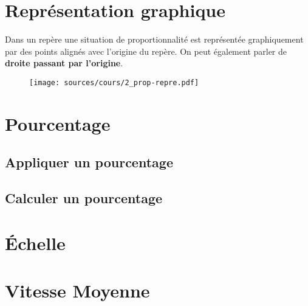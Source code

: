 \documentclass[paper=a4, fontsize=9pt]{scrartcl} %
\begin{document}
\section{Représentation graphique}

\begin{Proposition}
  Dans un repère une situation de proportionnalité est représentée graphiquement par des points alignés avec l'origine du repère. On peut également parler de \textbf{droite passant par l'origine}.
\end{Proposition}

\begin{figure}[H]
  \centering
  \texttt{[image: sources/cours/2\_prop-repre.pdf]}
\end{figure}


\section{Pourcentage}

\subsection{Appliquer un pourcentage}

\subsection{Calculer un pourcentage}

\section{Échelle}

\section{Vitesse Moyenne}
\end{document}
